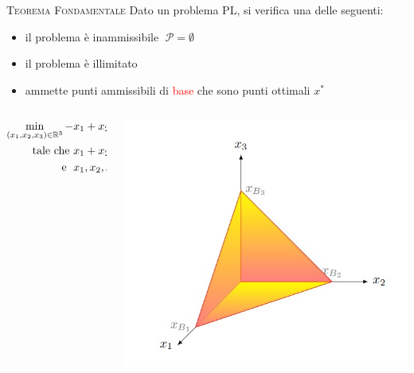 \begin{frame}[t]{\textsc{\LARGE \textcolor{maroon(x11)}{Teorema Fondamentale}}}
	Dato un problema PL, si verifica una delle seguenti: %
	\pause
\begin{itemize}
\item il problema è inammissibile $\;\mathcal{P}=\emptyset$\pause
\item il problema è illimitato\pause
\item ammette punti ammissibili di  \textcolor{red}{base} che sono punti ottimali $x^{*}$
\end{itemize}
\pause
\begin{columns}
\begin{column}{0.4\textwidth}
\begin{align*}
\min\limits_{(x_{1},x_{2},x_{3})\in\mathbb{R}^{3}} -&x_{1}+ x_{2}-4x_{3}\\
\text{tale che    }&x_{1}+x_{2}+x_{3}=1,\\
\text{\; e   \;} &x_{1}, x_{2}, x_{3} \geq 0
\end{align*}
\end{column}
\pause
\begin{column}{0.4\textwidth}
	\includegraphics[width=\columnwidth]{Feas.jpg}
\end{column}
\end{columns}
\end{frame}



